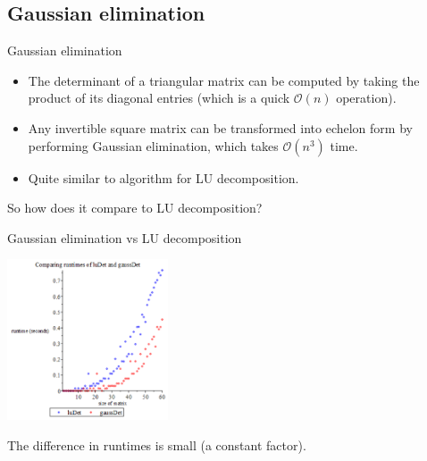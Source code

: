 \documentclass{beamer}
\begin{document}
\subsection{Gaussian elimination}

\begin{frame}{Gaussian elimination}

    \begin{itemize}

        \item The determinant of a triangular matrix can be computed by taking the product of its
            diagonal entries (which is a quick $\mathcal{O}(n)$ operation).

        \item Any invertible square matrix can be transformed into echelon form by performing
            Gaussian elimination, which takes $\mathcal{O}(n^3)$ time.

        \item Quite similar to algorithm for LU decomposition.

    \end{itemize}

    \pause{}

    So how does it compare to LU decomposition?

\end{frame}

\begin{frame}{Gaussian elimination vs LU decomposition}

    \begin{center}{}
        \includegraphics[height=180]{lu-gauss}
    \end{center}

    The difference in runtimes is small (a constant factor).

\end{frame}
\end{document}
